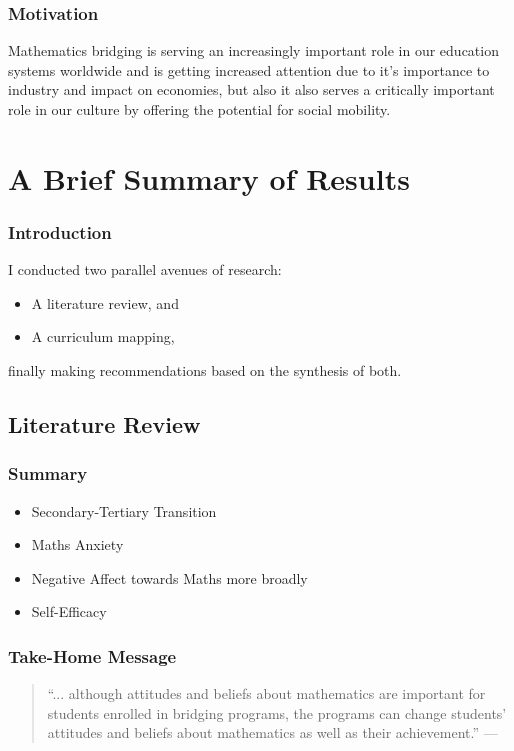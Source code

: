 \documentclass[14pt]{beamer}
\begin{document}
\begin{frame}
\frametitle{Motivation}
Mathematics bridging is serving an increasingly important role in our education systems worldwide and is getting increased attention due to it's importance to industry and impact on economies, but also it also serves a critically important role in our culture by offering the potential for social mobility.
\end{frame}

\section{A Brief Summary of Results}

\begin{frame}
\frametitle{Introduction}
I conducted two parallel avenues of research:
\begin{itemize}
	\item A literature review, and
	\item A curriculum mapping,
\end{itemize}
finally making recommendations based on the synthesis of both.
\end{frame}

\subsection{Literature Review}

\begin{frame}
\frametitle{Summary}
\begin{itemize}
	\item Secondary-Tertiary Transition \cite{Clark2008}
	\item Maths Anxiety \cite{Ramirez2018}
	\item Negative Affect towards Maths more broadly \cite{King2015}
	\item Self-Efficacy \cite{Klinger2011}
\end{itemize}
\end{frame}

\begin{frame}
\frametitle{Take-Home Message}
\begin{quote}
``... although attitudes and beliefs about mathematics are important for students
enrolled in bridging programs, the programs can change students' attitudes and
beliefs about mathematics as well as their achievement.'' \flushright ---
\end{quote}
\end{frame}
\end{document}
